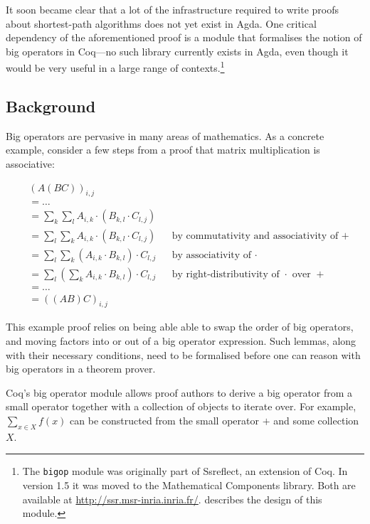 \documentclass[a4paper]{scrartcl}
\begin{document}
It soon became clear that a lot of the infrastructure required to write proofs about shortest-path algorithms does not yet exist in Agda.
One critical dependency of the aforementioned proof is a module that formalises the notion of big operators in Coq---no such library currently exists in Agda, even though it would be very useful in a large range of contexts.\footnote{The \texttt{bigop} module was originally part of Ssreflect, an extension of Coq. In version 1.5 it was moved to the Mathematical Components library. Both are available at \url{http://ssr.msr-inria.inria.fr/}. \autocite{bertot_canonical_2008} describes the design of this module.}

\subsection{Background}

Big operators are pervasive in many areas of mathematics. As a concrete example, consider a few steps from a proof that matrix multiplication is associative:

\begin{align*}
&\left(A \left(B C\right)\right)_{i,j} \\
&= \dots \\
&= \sum_k \sum_l  A_{i,k} \cdot \left( B_{k,l} \cdot C_{l,j} \right) \\
&= \sum_l \sum_k  A_{i,k} \cdot \left( B_{k,l} \cdot C_{l,j} \right)
  && \text{by commutativity and associativity of \(+\)} \\
&= \sum_l \sum_k \left( A_{i,k} \cdot B_{k,l} \right) \cdot C_{l,j}
  && \text{by associativity of \(\cdot\)} \\
&= \sum_l \left( \sum_k A_{i,k} \cdot B_{k,l} \right) \cdot C_{l,j}
  && \text{by right-distributivity of \(\cdot\) over \(+\)} \\
&= \dots \\
&= \left( \left( A  B \right) C\right)_{i,j}
\end{align*}

This example proof relies on being able able to swap the order of big operators, and moving factors into or out of a big operator expression. Such lemmas, along with their necessary conditions, need to be formalised before one can reason with big operators in a theorem prover.

Coq's big operator module allows proof authors to derive a big operator from a small operator together with a collection of objects to iterate over. For example, \(\sum_{x \in X} f(x)\) can be constructed from the small operator \(+\) and some collection \(X\).
\end{document}
